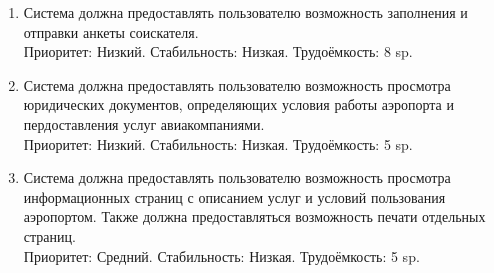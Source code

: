 \begin{enumerate}
      \item Система должна предоставлять пользователю возможность
            заполнения и отправки анкеты соискателя. \\
            Приоритет: Низкий. Стабильность: Низкая. Трудоёмкость: 8 sp.

      \item Система должна предоставлять пользователю возможность
            просмотра юридических документов, определяющих
            условия работы аэропорта и пердоставления
            услуг авиакомпаниями. \\
            Приоритет: Низкий. Стабильность: Низкая. Трудоёмкость: 5 sp.

      \item Система должна предоставлять пользователю возможность просмотра
            информационных страниц с описанием услуг и
            условий пользования аэропортом. Также должна
            предоставляться возможность печати отдельных
            страниц. \\
            Приоритет: Средний. Стабильность: Низкая. Трудоёмкость: 5 sp.

\end{enumerate}
